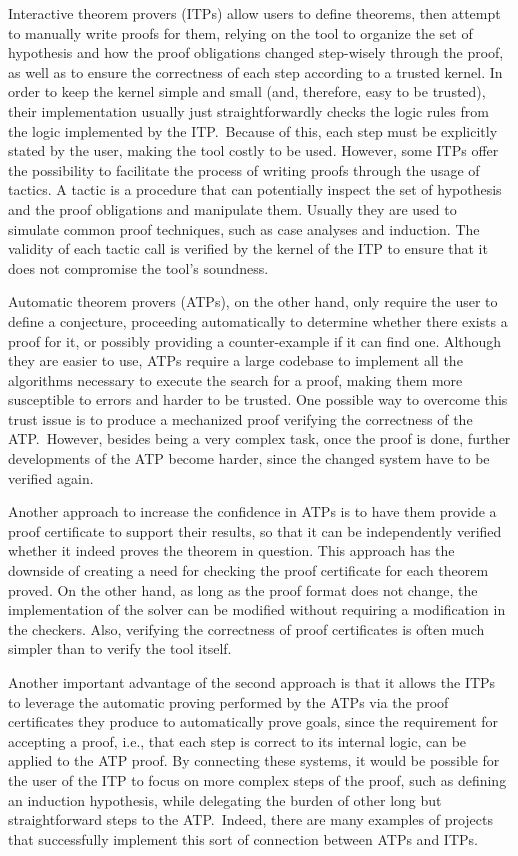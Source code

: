 Interactive theorem provers (ITPs) allow users to define
theorems, then attempt to manually write proofs for them,
relying on the tool to organize the set of hypothesis and
how the proof obligations changed step-wisely through the
proof, as well as to ensure the correctness of each step
according to a trusted kernel.
%
In order to keep the kernel simple and small (and, therefore,
easy to be trusted), their implementation usually just
straightforwardly checks the logic rules from the logic
implemented by the ITP.\ Because of this, each step must be
explicitly stated by the user, making the tool costly to be
used. However, some ITPs offer the possibility to facilitate
the process of writing proofs through the usage of tactics.
A tactic is a procedure that can potentially inspect the
set of hypothesis and the proof obligations and manipulate
them. Usually they are used to simulate common proof
techniques, such as case analyses and induction. The
validity of each tactic call is verified by the kernel
of the ITP to ensure that it does not compromise the tool's
soundness.
%

Automatic theorem provers (ATPs), on the other hand,
only require the user to define a conjecture, proceeding
automatically to determine whether there exists a proof
for it, or possibly providing a counter-example if it
can find one.
%
Although they are easier to use, ATPs require a large
codebase to implement all the algorithms necessary to execute
the search for a proof, making them more susceptible to
errors and harder to be trusted. One possible way to overcome
this trust issue is to produce a mechanized proof verifying
the correctness of the ATP.\ However, besides being a very
complex task, once the proof is done, further developments of
the ATP become harder, since the changed system have to be
verified again.

Another approach to increase the confidence in ATPs is to have them provide a
proof certificate to support their results, so that it can be independently verified whether
it indeed proves the theorem in question. This approach has the downside of creating a need
for checking the proof certificate for each theorem proved.
On the other hand, as long as the proof format does not change, the implementation
of the solver can be modified without requiring a modification in the checkers. Also,
verifying the correctness of proof certificates is often much simpler than to verify
the tool itself.

Another important advantage of the second approach is that it allows the ITPs to leverage the automatic proving performed by the ATPs via the proof certificates they produce to automatically prove goals, since the requirement for accepting a proof, i.e., that each step is correct to its internal logic, can be applied to the ATP proof.
%
By connecting these systems, it would be possible for the user of the ITP to focus on more complex steps of the proof, such as defining an induction hypothesis, while delegating the burden of other long but straightforward steps to the ATP.\
Indeed, there are many examples of projects that successfully
implement this sort of connection between ATPs and ITPs.

